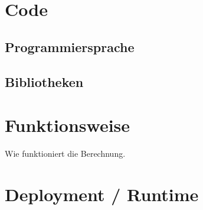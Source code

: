 \section{Code}
\subsection{Programmiersprache}

\subsection{Bibliotheken}

\section{Funktionsweise}
Wie funktioniert die Berechnung.

\section{Deployment / Runtime}